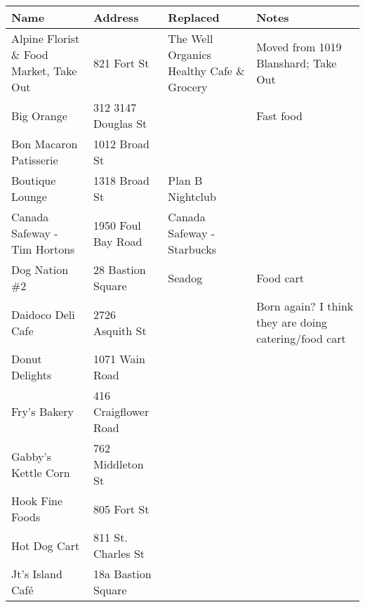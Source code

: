 \documentclass[9pt]{article}
\begin{document}
\begin{tabular}{p{5cm}|p{4cm}|p{5cm}|p{3cm}}
\textbf{Name} & \textbf{Address} & \textbf{Replaced} & \textbf{Notes}\\
\hline
Alpine Florist \& Food Market, Take Out & 821 Fort St           & The Well Organics Healthy Cafe \& Grocery & Moved from 1019 Blanshard; Take Out     \\
Big Orange                              & 312 3147 Douglas St   &                                           & Fast food                                 \\
Bon Macaron Patisserie                  & 1012 Broad St         &                                           &                                  \\
Boutique Lounge                         & 1318 Broad St         & Plan B Nightclub                          &                                  \\
Canada Safeway - Tim Hortons            & 1950 Foul Bay Road    & Canada Safeway - Starbucks                &                                  \\
Dog Nation \#2                          & 28 Bastion Square     & Seadog                                    &   Food cart                               \\
Daidoco Deli Cafe                       & 2726 Asquith St       &                                           & Born again? I think they are doing catering/food cart                      \\
Donut Delights                          & 1071 Wain Road        &                                           &                                  \\
Fry's Bakery                               & 416 Craigflower Road        &                                   &                 \\
Gabby's Kettle Corn                        & 762 Middleton St            &                                   &                 \\
Hook Fine Foods                            & 805 Fort St                 &                                   &                 \\
Hot Dog Cart                               & 811 St. Charles St          &                                   &                 \\
Jt's Island Café                           & 18a Bastion Square          &                                   &                 \\

\end{tabular}
\end{document}
